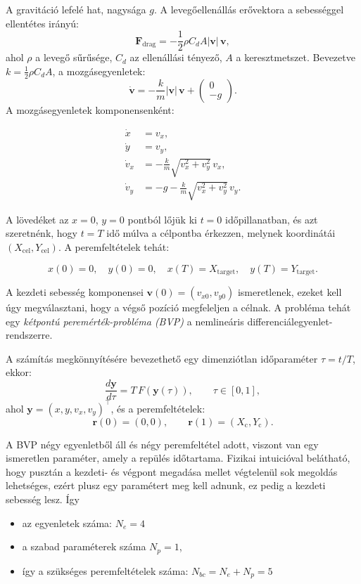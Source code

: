 A gravitáció lefelé hat, nagysága $g$. A levegőellenállás erővektora a sebességgel ellentétes irányú:
  \[
  \mathbf{F}_{\mathrm{drag}} = -\frac{1}{2}\rho C_d A |\mathbf{v}|\, \mathbf{v},
  \]
  ahol $\rho$ a levegő sűrűsége, $C_d$ az ellenállási tényező, $A$ a keresztmetszet. Bevezetve $k = \tfrac{1}{2}\rho C_d A$, a mozgásegyenletek:
  \[
  \dot{\mathbf{v}} = 
  -\frac{k}{m}|\mathbf{v}|\,\mathbf{v} + 
  \begin{pmatrix}0\\[3pt]-g\end{pmatrix}.
  \]
A mozgásegyenletek komponensenként:

\begin{align}
\dot{x} &= v_x, \nonumber \\
\dot{y} &= v_y,\nonumber\\
\dot{v}_x &= -\frac{k}{m}\sqrt{v_x^2 + v_y^2}\,v_x,\nonumber\\
\dot{v}_y &= -g - \frac{k}{m}\sqrt{v_x^2 + v_y^2}\,v_y.\nonumber
\end{align}


A lövedéket az $x=0$, $y=0$ pontból lőjük ki $t=0$ időpillanatban, és azt szeretnénk, hogy $t=T$ idő múlva a célpontba érkezzen, melynek koordinátái $(X_{\mathrm{cel}}, Y_{\mathrm{cel}})$.  
A peremfeltételek tehát:

\begin{equation}
x(0)=0,\quad y(0)=0,\quad 
x(T)=X_{\mathrm{target}},\quad y(T)=Y_{\mathrm{target}}.
\end{equation}

A kezdeti sebesség komponensei $\mathbf{v}(0) = (v_{x0}, v_{y0})$ ismeretlenek, ezeket kell úgy megválasztani, hogy a végső pozíció megfeleljen a célnak. A probléma tehát egy \emph{kétpontú peremérték-probléma (BVP)} a nemlineáris differenciálegyenlet-rendszerre.


A számítás megkönnyítésére bevezethető egy dimenziótlan időparaméter $\tau = t/T$, ekkor:
\[
\frac{d\mathbf{y}}{d\tau} = 
T\,F(\mathbf{y}(\tau)),
\qquad
\tau \in [0,1],
\]
ahol $\mathbf{y} = (x, y, v_x, v_y)^{\top}$, és a peremfeltételek:
\[
\mathbf{r}(0) = (0,0), \qquad 
\mathbf{r}(1) = (X_{\mathrm{c}}, Y_{\mathrm{c}}).
\]

A BVP négy egyenletből áll és négy peremfeltétel adott, viszont van egy ismeretlen paraméter, amely a repülés időtartama. Fizikai intuicióval belátható, hogy pusztán a kezdeti- és végpont megadása mellet végtelenül sok megoldás lehetséges, ezért plusz egy paramétert meg kell adnunk, ez pedig a kezdeti sebesség lesz. Így 
\begin{itemize}
\item az egyenletek száma: $N_e=4$
\item a szabad paraméterek száma $N_p=1$,
\item így a szükséges peremfeltételek száma: $N_{bc}=N_e+N_p=5$
\end{itemize}


